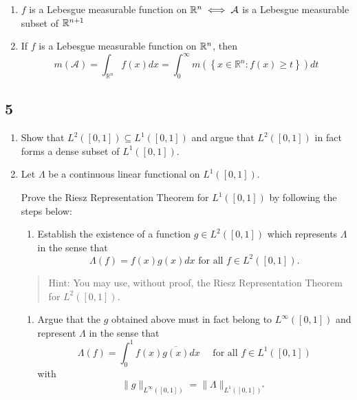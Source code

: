\begin{enumerate}
\def\labelenumi{\alph{enumi}.}
\item
  \(f\) is a Lebesgue measurable function on \({\mathbb{R}}^n \iff \mathcal A\)
  is a Lebesgue measurable subset of \({\mathbb{R}}^{n+1}\)
\item
  If \(f\) is a Lebesgue measurable function on \({\mathbb{R}}^n\), then \[
    m(\mathcal{A})=\int_{\mathbb{R}^{n}} f(x) d x=\int_{0}^{\infty} m\left(\left\{x \in \mathbb{R}^{n}: f(x) \geq t\right\}\right) d t
    \]
\end{enumerate}

\hypertarget{section-4}{%
\subsection{5}\label{section-4}}

\begin{enumerate}
\def\labelenumi{\alph{enumi}.}
\item
  Show that \(L^2([0, 1]) \subseteq L^1([0, 1])\) and argue that \(L^2([0, 1])\)
  in fact forms a dense subset of \(L^1([0, 1])\).
\item
  Let \(\Lambda\) be a continuous linear functional on \(L^1([0, 1])\).

  Prove the Riesz Representation Theorem for \(L^1([0, 1])\) by
  following the steps below:

  \begin{enumerate}
  \def\labelenumii{\roman{enumii}.}
  \tightlist
  \item
    Establish the existence of a function \(g \in L^2([0, 1])\) which
    represents \(\Lambda\) in the sense that \[
    \Lambda(f ) = f (x)g(x) dx \text{ for all } f \in L^2([0, 1]).
    \]
  \end{enumerate}

  \begin{quote}
  Hint: You may use, without proof, the Riesz Representation Theorem for
  \(L^2([0, 1])\).
  \end{quote}

  \begin{enumerate}
  \def\labelenumii{\roman{enumii}.}
  \setcounter{enumii}{1}
  \tightlist
  \item
    Argue that the \(g\) obtained above must in fact belong to
    \(L^\infty([0, 1])\) and represent \(\Lambda\) in the sense that \[
    \Lambda(f)=\int_{0}^{1} f(x) \overline{g(x)} d x \quad \text { for all } f \in L^{1}([0,1])
    \] with \[
    \|g\|_{L^{\infty}([0,1])}=\|\Lambda\|_{L^{1}([0,1])^*}
    \]
  \end{enumerate}
\end{enumerate}

